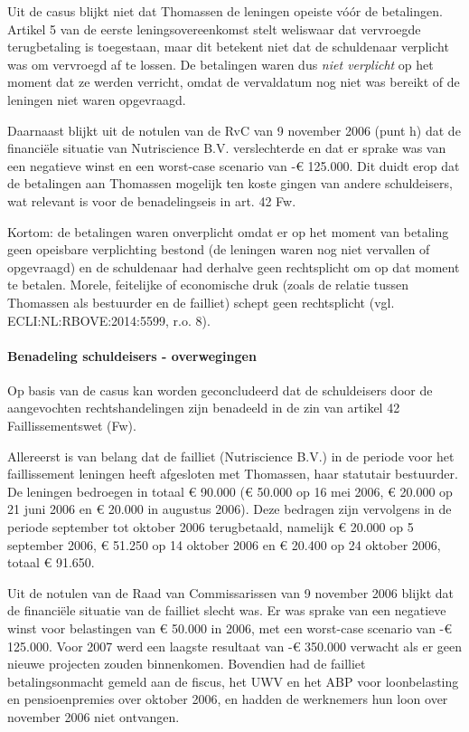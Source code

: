 \documentclass[
  dutch,
  a4paper,
]{article}
\begin{document}
Uit de casus blijkt niet dat Thomassen de leningen opeiste vóór de betalingen. Artikel 5 van de eerste leningsovereenkomst stelt weliswaar dat vervroegde terugbetaling is toegestaan, maar dit betekent niet dat de schuldenaar verplicht was om vervroegd af te lossen. De betalingen waren dus \emph{niet verplicht} op het moment dat ze werden verricht, omdat de vervaldatum nog niet was bereikt of de leningen niet waren opgevraagd.

Daarnaast blijkt uit de notulen van de RvC van 9 november 2006 (punt h) dat de financiële situatie van Nutriscience B.V. verslechterde en dat er sprake was van een negatieve winst en een worst-case scenario van -€ 125.000. Dit duidt erop dat de betalingen aan Thomassen mogelijk ten koste gingen van andere schuldeisers, wat relevant is voor de benadelingseis in art. 42 Fw.

Kortom: de betalingen waren onverplicht omdat er op het moment van betaling geen opeisbare verplichting bestond (de leningen waren nog niet vervallen of opgevraagd) en de schuldenaar had derhalve geen rechtsplicht om op dat moment te betalen. Morele, feitelijke of economische druk (zoals de relatie tussen Thomassen als bestuurder en de failliet) schept geen rechtsplicht (vgl. ECLI:NL:RBOVE:2014:5599, r.o. 8).

\paragraph{Benadeling schuldeisers - overwegingen}\label{benadeling-schuldeisers---overwegingen-78}

Op basis van de casus kan worden geconcludeerd dat de schuldeisers door de aangevochten rechtshandelingen zijn benadeeld in de zin van artikel 42 Faillissementswet (Fw).

Allereerst is van belang dat de failliet (Nutriscience B.V.) in de periode voor het faillissement leningen heeft afgesloten met Thomassen, haar statutair bestuurder. De leningen bedroegen in totaal € 90.000 (€ 50.000 op 16 mei 2006, € 20.000 op 21 juni 2006 en € 20.000 in augustus 2006). Deze bedragen zijn vervolgens in de periode september tot oktober 2006 terugbetaald, namelijk € 20.000 op 5 september 2006, € 51.250 op 14 oktober 2006 en € 20.400 op 24 oktober 2006, totaal € 91.650.

Uit de notulen van de Raad van Commissarissen van 9 november 2006 blijkt dat de financiële situatie van de failliet slecht was. Er was sprake van een negatieve winst voor belastingen van € 50.000 in 2006, met een worst-case scenario van -€ 125.000. Voor 2007 werd een laagste resultaat van -€ 350.000 verwacht als er geen nieuwe projecten zouden binnenkomen. Bovendien had de failliet betalingsonmacht gemeld aan de fiscus, het UWV en het ABP voor loonbelasting en pensioenpremies over oktober 2006, en hadden de werknemers hun loon over november 2006 niet ontvangen.
\end{document}
